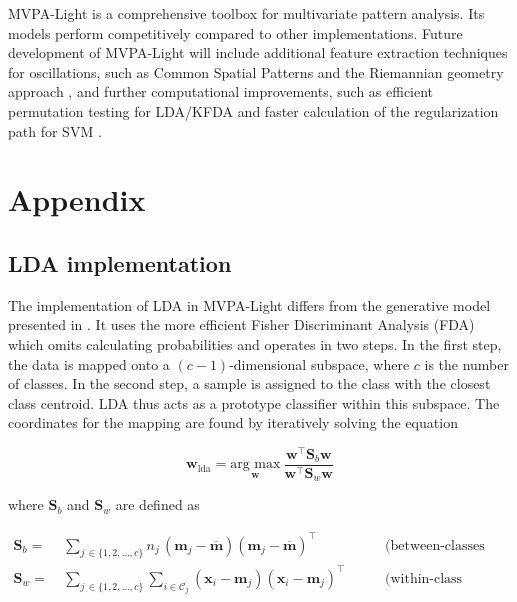 \documentclass[utf8]{frontiersSCNS} %
\newcommand{\m}{\mathbf{m}}
\newcommand{\mbar}{\overline{\m}}
\newcommand{\mm}[1]{\m_{#1}}
\newcommand{\w}{\mathbf{w}}
\newcommand{\x}{\mathbf{x}}
\renewcommand{\S}{\mathbf{S}}
\begin{document}
MVPA-Light is a comprehensive toolbox for multivariate pattern analysis. Its models perform competitively compared to other implementations. Future development of MVPA-Light will include additional feature extraction techniques for oscillations, such as Common Spatial Patterns \citep{Blankertz2008a} and the Riemannian geometry approach \citep{Barachant2013}, and further computational improvements, such as efficient permutation testing for LDA/KFDA \citep{Treder2019DirectFDA} and faster calculation of the regularization path for SVM \citep{Hastie2004TheMachine}.

\section{Appendix}


\subsection{LDA implementation}\label{sec:lda_implementation}

The implementation of LDA in MVPA-Light differs from the generative model presented in . It uses the more efficient Fisher Discriminant Analysis (FDA)  \citep{Fisher1936} which omits calculating probabilities and operates in two steps. In the first step, the data is mapped onto a $(c-1)$-dimensional subspace, where $c$ is the number of classes. In the second step, a sample is assigned to the class with the closest class centroid. LDA thus acts as a prototype classifier within this subspace. The coordinates for the mapping are found by iteratively solving the equation

\begin{equation}
\label{eq:fda}
\w_{\text{lda}} = \underset{\w}{\text{arg max}}\ \frac{\w^\top \S_b\w}{\w^\top \S_w\w}
\end{equation}

where $\S_b$ and $\S_w$ are defined as

\begin{equation*}
\begin{alignedat}{2}
\S_b =\ & \sum_{j\,\in\{1,2,...,c\}}n_j\,(\mm{j} -\mbar) (\mm{j} - \mbar)^\top\ \quad &&\text{(between-classes scatter)}\\
\S_w =\ & \sum_{j\,\in\{1,2,...,c\}}\sum_{i\in\mathcal{C}_j} (\x_i - \mm{j})(\x_i - \mm{j})^\top\  \quad &&\text{(within-class scatter)}\\
\end{alignedat}
\end{equation*}
\end{document}
